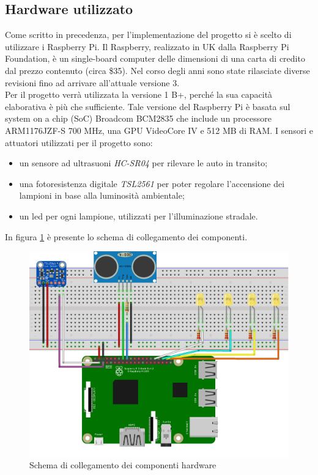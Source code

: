 \subsection{Hardware utilizzato}
Come scritto in precedenza, per l'implementazione del progetto si è scelto di utilizzare i Raspberry Pi.
Il Raspberry, realizzato in UK dalla Raspberry Pi Foundation, è un single-board computer delle dimensioni di una carta di credito dal prezzo contenuto (circa \$35).
Nel corso degli anni sono state rilasciate diverse revisioni fino ad arrivare all’attuale versione 3.
\\Per il progetto verrà utilizzata la versione 1 B+, perché la sua capacità elaborativa è più che sufficiente.
Tale versione del Raspberry Pi è basata sul system on a chip (SoC) Broadcom BCM2835 che include un processore ARM1176JZF-S 700 MHz, una GPU VideoCore IV e 512 MB di RAM.
I sensori e attuatori utilizzati per il progetto sono:
\begin{itemize}
 \item un sensore ad ultrasuoni \textit{HC-SR04} per rilevare le auto in transito;
 \item una fotoresistenza digitale \textit{TSL2561} per poter regolare l'accensione dei lampioni in base alla luminosità ambientale;
 \item un led per ogni lampione, utilizzati per l'illuminazione stradale.
\end{itemize}
In figura \ref{sketch} è presente lo schema di collegamento dei componenti.
\begin{figure}[tbp]
	\centering
	\includegraphics[width=13cm]{figure/Sketch_rpi.png}
	\caption{Schema di collegamento dei componenti hardware \label{sketch}}
\end{figure}

